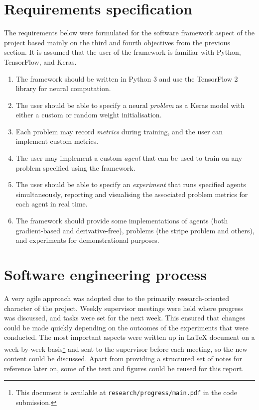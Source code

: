 \section{Requirements specification}
The requirements below were formulated for the software framework aspect of the project based mainly on the third and fourth objectives from the previous section.
It is assumed that the user of the framework is familiar with Python, TensorFlow, and Keras.
\begin{enumerate}
    \item The framework should be written in Python 3 and use the TensorFlow 2 library for neural computation.
    \item The user should be able to specify a neural \textit{problem} as a Keras model with either a custom or random weight initialisation.
    \item Each problem may record \textit{metrics} during training, and the user can implement custom metrics.
    \item The user may implement a custom \textit{agent} that can be used to train on any problem specified using the framework.
    \item The user should be able to specify an \textit{experiment} that runs specified agents simultaneously, reporting and visualising the associated problem metrics for each agent in real time. 
    \item The framework should provide some implementations of agents (both gradient-based and derivative-free), problems (the stripe problem and others), and experiments for demonstrational purposes.
\end{enumerate}

\section{Software engineering process}
A very agile approach was adopted due to the primarily research-oriented character of the project.
Weekly supervisor meetings were held where progress was discussed, and tasks were set for the next week.
This ensured that changes could be made quickly depending on the outcomes of the experiments that were conducted.
The most important aspects were written up in \LaTeX{} document on a week-by-week basis\footnote{This document is available at \texttt{research/progress/main.pdf} in the code submission.} and sent to the supervisor before each meeting, so the new content could be discussed.
Apart from providing a structured set of notes for reference later on, some of the text and figures could be reused for this report.

